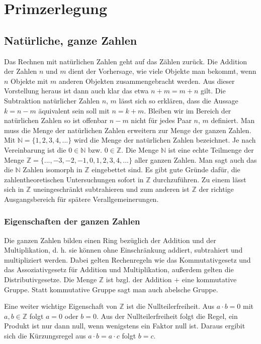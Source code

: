 \documentclass[a4paper,11pt]{article}
\begin{document}
\newpage
\section{Primzerlegung}
\subsection{Natürliche, ganze Zahlen}
Das Rechnen mit natürlichen Zahlen geht auf das Zählen zurück. Die Addition
der Zahlen $n$ und $m$ dient der Vorhersage, wie viele Objekte man bekommt,
wenn $n$ Objekte mit $m$ anderen Objekten zusammengebracht werden. Aus
dieser Vorstellung heraus ist dann auch klar das etwa $n + m = m + n$ gilt.
Die Subtraktion natürlicher Zahlen $n$, $m$ lässt sich so erklären, dass
die Aussage $k = n - m$ äquivalent sein soll mit $n = k + m$. Bleiben wir
im Bereich der natürlichen Zahlen so ist offenbar $n-m$ nicht für jedes
Paar $n$, $m$ definiert. Man muss die Menge der natürlichen Zahlen
erweitern zur Menge der ganzen Zahlen. Mit
${\mathbb N}=\{1, 2, 3, 4, ...\}$ wird die Menge der natürlichen Zahlen
bezeichnet. Je nach Vereinbarung ist die $0 \in {\mathbb N}$ bzw.
$0 \in {\mathbb Z}$. Die Menge ${\mathbb N}$ ist eine echte Teilmenge der
Menge ${\mathbb Z}=\{..., -3, -2, -1, 0, 1, 2, 3, 4, ...\}$ aller ganzen
Zahlen. Man sagt auch das die ${\mathbb N}$ Zahlen isomorph in ${\mathbb Z}$
eingebettet sind. Es gibt gute Gründe dafür, die zahlentheoretischen
Untersuchungen sofort in ${\mathbb Z}$ durchzuführen. Zu einem lässt sich in
${\mathbb Z}$ uneingeschränkt subtrahieren und zum anderen ist ${\mathbb Z}$
der richtige Ausgangsbereich für spätere Verallgemeinerungen.

\subsubsection*{Eigenschaften der ganzen Zahlen}
Die ganzen Zahlen bilden einen Ring bezüglich der Addition und der
Multiplikation, d. h. sie können ohne Einschränkung addiert, subtrahiert
und multipliziert werden. Dabei gelten Rechenregeln wie das Kommutativgesetz
und das Assoziativgesetz für Addition und Multiplikation, außerdem gelten
die Distributivgesetze. Die Menge ${\mathbb Z}$ ist bzgl. der Addition
$+$ eine kommutative Gruppe. Statt kommutative Gruppe sagt man auch
abelsche Gruppe.

Eine weiter wichtige Eigenschaft von ${\mathbb Z}$ ist die
Nullteilerfreiheit. Aus $a\cdot b =  0$ mit $a, b \in {\mathbb Z}$
folgt $a = 0$ oder $b = 0$. Aus der Nullteilerfreiheit folgt die
Regel, ein Produkt ist nur dann null, wenn wenigstens
ein Faktor null ist. Daraus ergibit sich die Kürzungsregel aus
$a\cdot b = a\cdot c$ folgt $b = c$.
\end{document}
